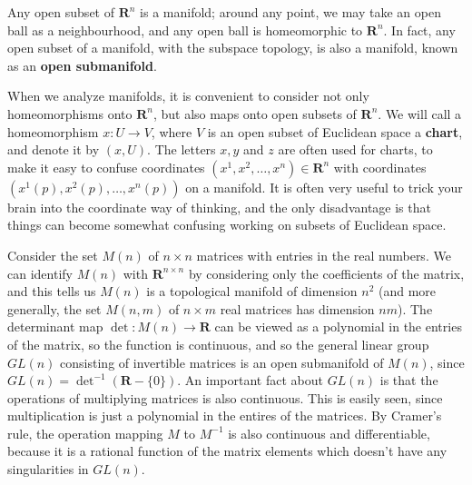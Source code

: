 Any open subset of $\mathbf{R}^n$ is a manifold; around any point, we may take an open ball as a neighbourhood, and any open ball is homeomorphic to $\mathbf{R}^n$. In fact, any open subset of a manifold, with the subspace topology, is also a manifold, known as an {\bf open submanifold}.

When we analyze manifolds, it is convenient to consider not only homeomorphisms onto $\mathbf{R}^n$, but also maps onto open subsets of $\mathbf{R}^n$. We will call a homeomorphism $x: U \to V$, where $V$ is an open subset of Euclidean space a {\bf chart}, and denote it by $(x,U)$. The letters $x,y$ and $z$ are often used for charts, to make it easy to confuse coordinates $(x^1,x^2, \dots, x^n) \in \mathbf{R}^n$ with coordinates $(x^1(p), x^2(p), \dots, x^n(p))$ on a manifold. It is often very useful to trick your brain into the coordinate way of thinking, and the only disadvantage is that things can become somewhat confusing working on subsets of Euclidean space.

\begin{example}
    Consider the set $M(n)$ of $n \times n$ matrices with entries in the real numbers. We can identify $M(n)$ with $\mathbf{R}^{n \times n}$ by considering only the coefficients of the matrix, and this tells us $M(n)$ is a topological manifold of dimension $n^2$ (and more generally, the set $M(n,m)$ of $n \times m$ real matrices has dimension $nm$). The determinant map $\det:M(n) \to \mathbf{R}$ can be viewed as a polynomial in the entries of the matrix, so the function is continuous, and so the general linear group $GL(n)$ consisting of invertible matrices is an open submanifold of $M(n)$, since $GL(n) = \det^{-1}(\mathbf{R} - \{ 0 \})$. An important fact about $GL(n)$ is that the operations of multiplying matrices is also continuous. This is easily seen, since multiplication is just a polynomial in the entires of the matrices. By Cramer's rule, the operation mapping $M$ to $M^{-1}$ is also continuous and differentiable, because it is a rational function of the matrix elements which doesn't have any singularities in $GL(n)$.
\end{example}

